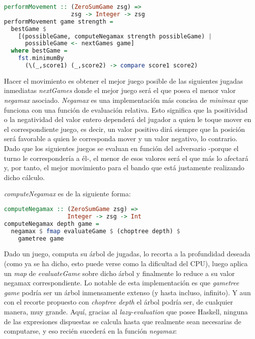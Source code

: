 \documentclass{llncs}
\begin{document}
\begin{lstlisting}[frame=single, language=haskell, captionpos=b, caption=Definición de performMovement, label={lst:perform_movement}]
performMovement :: (ZeroSumGame zsg) =>
                   zsg -> Integer -> zsg
performMovement game strength =
  bestGame $
    [(possibleGame, computeNegamax strength possibleGame) |
      possibleGame <- nextGames game]
  where bestGame =
    fst.minimumBy
      (\(_,score1) (_,score2) -> compare score1 score2)
\end{lstlisting}

Hacer el movimiento es obtener el mejor juego posible de las siguientes jugadas inmediatas \textit{nextGames} donde el mejor juego será el que posea el menor valor \textit{negamax} asociado. \textit{Negamax} es una implementación más concisa de \textit{minimax} que funciona con una función de evaluación relativa. Esto significa que la positividad o la negatividad del valor entero dependerá del jugador a quien le toque mover en el correspondiente juego, es decir, un valor positivo dirá siempre que la posición será favorable a quien le corresponda mover y un valor negativo, lo contrario. Dado que los siguientes juegos se evaluan en función del adversario -porque el turno le correspondería a él-, el menor de esos valores será el que más lo afectará y, por tanto, el mejor movimiento para el bando que está justamente realizando dicho cálculo.

\textit{computeNegamax} es de la siguiente forma:

\begin{lstlisting}[frame=single, language=haskell, captionpos=b, caption=Definición de computeNegamax, label={lst:compute_negamax}]
computeNegamax :: (ZeroSumGame zsg) =>
                  Integer -> zsg -> Int
computeNegamax depth game =
  negamax $ fmap evaluateGame $ (choptree depth) $
    gametree game
\end{lstlisting}

Dado un juego, computa su árbol de jugadas, lo recorta a la profundidad deseada (como ya se ha dicho, esto puede verse como la dificultad del CPU), luego aplica un \textit{map} de \textit{evaluateGame} sobre dicho árbol y finalmente lo reduce a su valor negamax correspondiente. Lo notable de esta implementación es que \textit{gametree game} podría ser un árbol inmensamente extenso (y hasta incluso, infinito). Y aun con el recorte propuesto con \textit{choptree depth} el árbol podría ser, de cualquier manera, muy grande. Aquí, gracias al \textit{lazy-evaluation} que posee Haskell, ninguna de las expresiones dispuestas se calcula hasta que realmente sean necesarias de computarse, y eso recién sucederá en la función \textit{negamax}:
\end{document}
